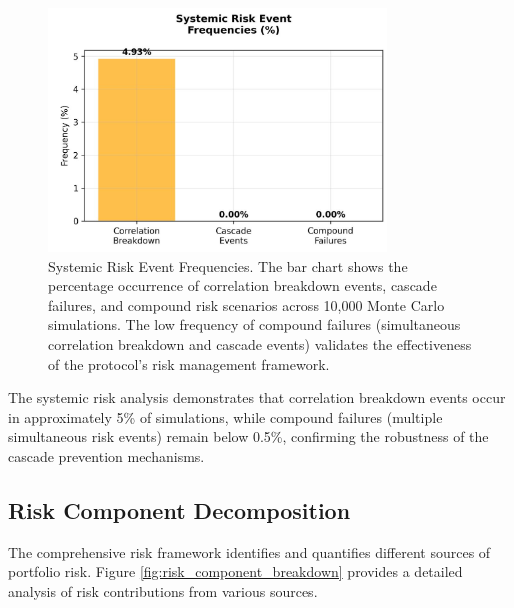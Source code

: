 \documentclass[12pt]{article}
\begin{document}
\begin{figure}[h]
    \centering
    \includegraphics[width=0.8\textwidth]{systemic_risk_events.jpeg}
    \caption{Systemic Risk Event Frequencies. The bar chart shows the percentage occurrence of correlation breakdown events, cascade failures, and compound risk scenarios across 10,000 Monte Carlo simulations. The low frequency of compound failures (simultaneous correlation breakdown and cascade events) validates the effectiveness of the protocol's risk management framework.}
    \label{fig:systemic_risk_events}
\end{figure}

The systemic risk analysis demonstrates that correlation breakdown events occur in approximately 5\% of simulations, while compound failures (multiple simultaneous risk events) remain below 0.5\%, confirming the robustness of the cascade prevention mechanisms.

\subsection{Risk Component Decomposition}

The comprehensive risk framework identifies and quantifies different sources of portfolio risk. Figure \ref{fig:risk_component_breakdown} provides a detailed analysis of risk contributions from various sources.
\end{document}
